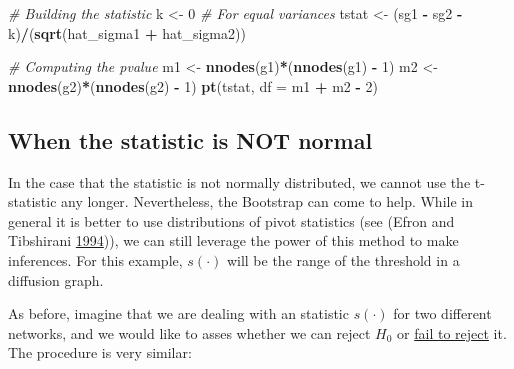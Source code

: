 \documentclass[]{book}
\newenvironment{Shaded}{\begin{snugshade}}{\end{snugshade}}
\newcommand{\CommentTok}[1]{\textcolor[rgb]{0.56,0.35,0.01}{\textit{#1}}}
\newcommand{\DataTypeTok}[1]{\textcolor[rgb]{0.13,0.29,0.53}{#1}}
\newcommand{\DecValTok}[1]{\textcolor[rgb]{0.00,0.00,0.81}{#1}}
\newcommand{\KeywordTok}[1]{\textcolor[rgb]{0.13,0.29,0.53}{\textbf{#1}}}
\newcommand{\NormalTok}[1]{#1}
\newcommand{\OperatorTok}[1]{\textcolor[rgb]{0.81,0.36,0.00}{\textbf{#1}}}
\newcommand{\StringTok}[1]{\textcolor[rgb]{0.31,0.60,0.02}{#1}}
\begin{document}
\begin{enumerate}
\begin{Shaded}
\begin{Highlighting}[]
\CommentTok{# Building the statistic}
\NormalTok{k <-}\StringTok{ }\DecValTok{0} \CommentTok{# For equal variances}
\NormalTok{tstat <-}\StringTok{ }\NormalTok{(sg1 }\OperatorTok{-}\StringTok{ }\NormalTok{sg2 }\OperatorTok{-}\StringTok{ }\NormalTok{k)}\OperatorTok{/}\NormalTok{(}\KeywordTok{sqrt}\NormalTok{(hat_sigma1 }\OperatorTok{+}\StringTok{ }\NormalTok{hat_sigma2))}

\CommentTok{# Computing the pvalue}
\NormalTok{m1 <-}\StringTok{ }\KeywordTok{nnodes}\NormalTok{(g1)}\OperatorTok{*}\NormalTok{(}\KeywordTok{nnodes}\NormalTok{(g1) }\OperatorTok{-}\StringTok{ }\DecValTok{1}\NormalTok{)}
\NormalTok{m2 <-}\StringTok{ }\KeywordTok{nnodes}\NormalTok{(g2)}\OperatorTok{*}\NormalTok{(}\KeywordTok{nnodes}\NormalTok{(g2) }\OperatorTok{-}\StringTok{ }\DecValTok{1}\NormalTok{)}
\KeywordTok{pt}\NormalTok{(tstat, }\DataTypeTok{df =}\NormalTok{ m1 }\OperatorTok{+}\StringTok{ }\NormalTok{m2 }\OperatorTok{-}\StringTok{ }\DecValTok{2}\NormalTok{)}
\end{Highlighting}
\end{Shaded}
\end{enumerate}

\hypertarget{when-the-statistic-is-not-normal}{%
\subsection{When the statistic is NOT normal}\label{when-the-statistic-is-not-normal}}

In the case that the statistic is not normally distributed, we cannot use the
t-statistic any longer. Nevertheless, the Bootstrap can come to help. While
in general it is better to use distributions of pivot statistics (see (Efron and Tibshirani \protect\hyperlink{ref-Efron1994}{1994})),
we can still leverage the power of this method to make inferences. For this
example, \(s(\cdot)\) will be the range of the threshold in a diffusion graph.

As before, imagine that we are dealing with an statistic \(s(\cdot)\) for two
different networks, and we would like to asses whether we can reject \(H_0\)
or \href{https://www.thoughtco.com/fail-to-reject-in-a-hypothesis-test-3126424}{fail to reject} it.
The procedure is very similar:
\end{document}

